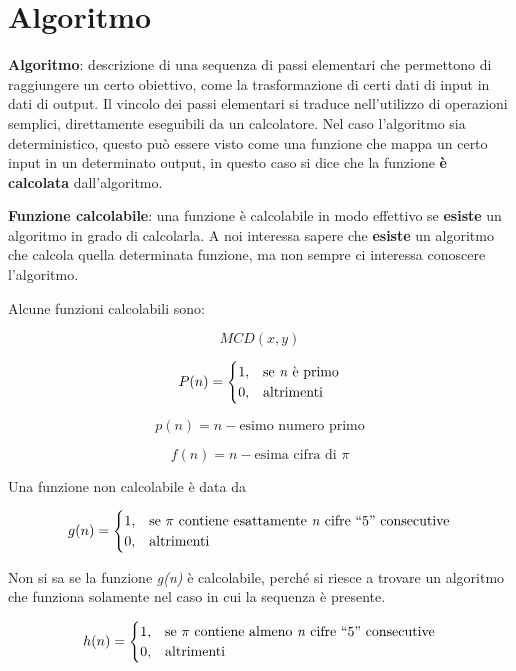 
\section{Algoritmo}\label{algoritmo}

\textbf{Algoritmo}: descrizione di una sequenza di passi elementari che
permettono di raggiungere un certo obiettivo, come la trasformazione di
certi dati di input in dati di output. Il vincolo dei passi elementari
si traduce nell'utilizzo di operazioni semplici, direttamente eseguibili
da un calcolatore. Nel caso l'algoritmo sia deterministico, questo può
essere visto come una funzione che mappa un certo input in un
determinato output, in questo caso si dice che la funzione \textbf{è
calcolata} dall'algoritmo.

\textbf{Funzione calcolabile}: una funzione è calcolabile in modo
effettivo se \textbf{esiste} un algoritmo in grado di calcolarla. A noi
interessa sapere che \textbf{esiste} un algoritmo che calcola quella
determinata funzione, ma non sempre ci interessa conoscere l'algoritmo.

Alcune funzioni calcolabili sono:

$$ MCD(x,y) $$

$$
P(n) = \begin{cases}
1, &\text{se \textit{n} è primo} \\
0, &\text{altrimenti}
\end{cases}
$$

$$ p(n) = n-\text{esimo numero primo}$$

$$ f(n) = n-\text{esima cifra di }\pi$$

Una funzione non calcolabile è data da

$$
g(n) = \begin{cases}
1, &\text{se $\pi$ contiene esattamente \textit{n} cifre ``5'' consecutive} \\
0, &\text{altrimenti}
\end{cases}
$$

Non si sa se la funzione \emph{g(n)} è calcolabile, perché si riesce a
trovare un algoritmo che funziona solamente nel caso in cui la sequenza
è presente.

$$
h(n) = \begin{cases}
1, &\text{se $\pi$ contiene almeno \textit{n} cifre ``5'' consecutive} \\
0, &\text{altrimenti}
\end{cases}
$$

